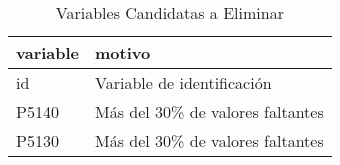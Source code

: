 \begin{table}[ht]
\centering
\begin{tabular}{ll}
  \toprule
variable & motivo \\ 
  \midrule
id & Variable de identificación \\ 
  P5140 & Más del 30\% de valores faltantes \\ 
  P5130 & Más del 30\% de valores faltantes \\ 
   \bottomrule
\end{tabular}
\caption{Variables Candidatas a Eliminar} 
\label{tab:variables_eliminar}
\end{table}
